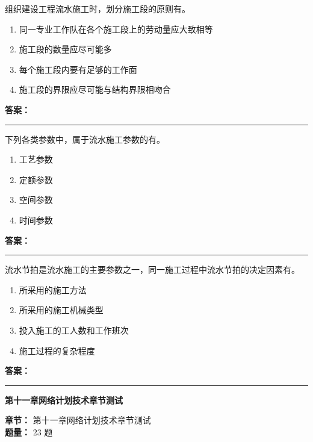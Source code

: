 \documentclass[UTF8,fontset=fandol,11pt]{ctexart}
\newcommand{\chaptertitle}[1]{\vspace{0.5em}\begin{tcolorbox}[enhanced,colback=deepblue,colframe=deepblue,arc=2mm,boxrule=0pt]\begin{center}\Large\bfseries\color{white}#1\end{center}\end{tcolorbox}\vspace{0.5em}}
\newcommand{\answerline}{\textcolor{answerred}{\rule{2.4cm}{0.7pt}}}
\begin{document}
\vspace{0.2em}

\begin{quizbox}[title={第 21 题}]
组织建设工程流水施工时，划分施工段的原则有。\\
\begin{enumerate}[label=\Alph*.]
\item 同一专业工作队在各个施工段上的劳动量应大致相等
\item 施工段的数量应尽可能多
\item 每个施工段内要有足够的工作面
\item 施工段的界限应尽可能与结构界限相吻合
\end{enumerate}
\textbf{\textcolor{answerred}{答案：}} \answerline
\end{quizbox}

\vspace{0.2em}

\begin{quizbox}[title={第 22 题}]
下列各类参数中，属于流水施工参数的有。\\
\begin{enumerate}[label=\Alph*.]
\item 工艺参数
\item 定额参数
\item 空间参数
\item 时间参数
\end{enumerate}
\textbf{\textcolor{answerred}{答案：}} \answerline
\end{quizbox}

\vspace{0.2em}

\begin{quizbox}[title={第 23 题}]
流水节拍是流水施工的主要参数之一，同一施工过程中流水节拍的决定因素有。\\
\begin{enumerate}[label=\Alph*.]
\item 所采用的施工方法
\item 所采用的施工机械类型
\item 投入施工的工人数和工作班次
\item 施工过程的复杂程度
\end{enumerate}
\textbf{\textcolor{answerred}{答案：}} \answerline
\end{quizbox}

\vspace{0.2em}

\chaptertitle{第十一章网络计划技术章节测试}
\begin{mainbox}
\textbf{\textcolor{mainblue}{章节：}} 第十一章网络计划技术章节测试\\
\textbf{\textcolor{answerred}{题量：}} 23 题
\end{mainbox}
\end{document}
